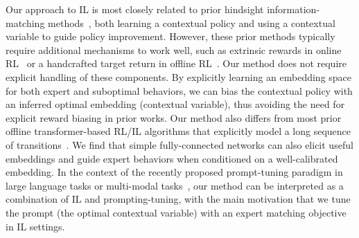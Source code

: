Our approach to IL is most closely related to prior hindsight information-matching methods~\citep{ajay2022conditional, brandfonbrener2022does, furuta2021generalized, liu2022learn}, both learning a contextual policy and using a contextual variable to guide policy improvement. 
However, these prior methods typically require additional mechanisms to work well, such as extrinsic rewards in online RL~\citep{arulkumaran2022all, kumar2019reward, srivastava2019training} or a handcrafted target return in offline RL~\citep{chen2021decision, emmons2021rvs}. Our method does not require explicit handling of these components. 
By explicitly learning an embedding space for both expert and suboptimal behaviors, we can bias the contextual policy with an inferred optimal embedding (contextual variable), thus avoiding the need for explicit reward biasing in prior works. 
Our method also differs from most prior offline transformer-based RL/IL algorithms that explicitly model a long sequence of transitions~\citep{carroll2022unimask, chen2021decision, janner2021offline, kang2023beyond, lai2023chipformer, xu2022prompting}. We find that simple fully-connected networks can also elicit useful embeddings and guide expert behaviors when conditioned on a well-calibrated embedding. 
In the context of the recently proposed prompt-tuning paradigm in large language tasks or multi-modal tasks~\citep{gao2021clip, lester2021power, zhou2022learning}, our method can be interpreted as a combination of IL and prompting-tuning, with the main motivation that we tune the prompt (the optimal contextual variable) with an expert matching objective in IL settings. 










